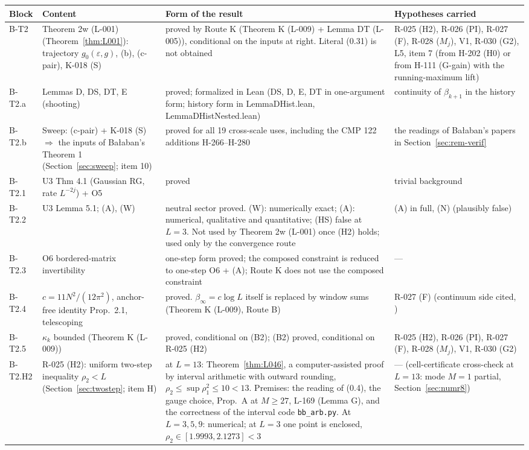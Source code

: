 \begingroup\small\tablefiles
\begin{longtable}{|p{1.3cm}|p{3.3cm}|p{6.2cm}|p{3.6cm}|}
\hline
Block & Content & Form of the result & Hypotheses carried \\ \hline
\endhead
B-T2 & Theorem 2w (L-001) (Theorem~\ref{thm:L001}): trajectory $g_0(\varepsilon,g)$, (b), (c-pair), K-018 (S) & proved by Route K (Theorem K (L-009) + Lemma DT (L-005)), conditional on the inputs at right. Literal (0.31) is not obtained & R-025 (H2), R-026 (PI), R-027 (F), R-028 ($M_j$), V1, R-030 (G2), L5, item 7 (from H-202 (H0) or from H-111 (G-gain) with the running-maximum lift) \\ \hline
B-T2.a & Lemmas D, DS, DT, E (shooting) & proved; formalized in Lean (DS, D, E, DT in one-argument form; history form in LemmaDHist.lean, LemmaDHistNested.lean) & continuity of $\beta_{k+1}$ in the history \\ \hline
B-T2.b & Sweep: (c-pair) + K-018 (S) $\Rightarrow$ the inputs of Ba{\l}aban's Theorem 1 (Section~\ref{sec:sweep}; item 10) & proved for all 19 cross-scale uses, including the CMP 122 additions H-266--H-280 & the readings of Ba{\l}aban's papers in Section~\ref{sec:rem-verif} \\ \hline
B-T2.1 & U3 Thm 4.1 (Gaussian RG, rate $L^{-2j}$) + O5 & proved & trivial background \\ \hline
B-T2.2 & U3 Lemma 5.1; (A), (W) & neutral sector proved. (W): numerically exact; (A): numerical, qualitative and quantitative; (HS) false at $L=3$. Not used by Theorem 2w (L-001) once (H2) holds; used only by the convergence route & (A) in full, (N) (plausibly false) \\ \hline
B-T2.3 & O6 bordered-matrix invertibility & one-step form proved; the composed constraint is reduced to one-step O6 + (A); Route K does not use the composed constraint & --- \\ \hline
B-T2.4 & $c=11N^2/(12\pi^2)$, anchor-free identity Prop.\ 2.1, telescoping & proved. $\beta_\infty=c\log L$ itself is replaced by window sums (Theorem K (L-009), Route B) & R-027 (F) (continuum side cited, \cite{savvidy1977}) \\ \hline
B-T2.5 & $\kappa_k$ bounded (Theorem K (L-009)) & proved, conditional on (B2); (B2) proved, conditional on R-025 (H2) & R-025 (H2), R-026 (PI), R-027 (F), R-028 ($M_j$), V1, R-030 (G2) \\ \hline
B-T2.H2 & R-025 (H2): uniform two-step inequality $\rho_2<L$ (Section~\ref{sec:twostep}; item H) & at $L=13$: Theorem~\ref{thm:L046}, a computer-assisted proof by interval arithmetic with outward rounding, $\rho_2\le\sup\rho_1^2\le10<13$. Premises: the reading of (0.4), the gauge choice, Prop.\ A at $M\ge27$, L-169 (Lemma G), and the correctness of the interval code \texttt{bb\_arb.py}. At $L=3,5,9$: numerical; at $L=3$ one point is enclosed, $\rho_2\in[1.9993,2.1273]<3$ & --- (cell-certificate cross-check at $L=13$: mode $M=1$ partial, Section~\ref{sec:numr8}) \\ \hline

\end{longtable}
